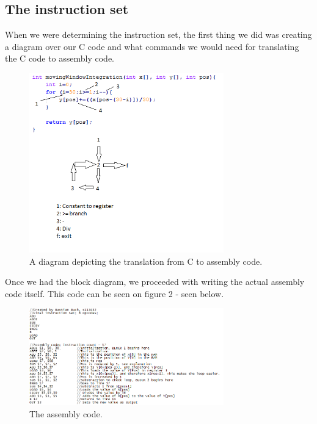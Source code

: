 \documentclass[12pt,a4paper]{article}
\begin{document}
\subsection{The instruction set}
When we were determining the instruction set, the first thing we did was creating a diagram over our C code and what commands we would need for translating the C code to assembly code.
\newpage
\begin{figure}[h!]
  \centering
    \includegraphics[width=0.75\textwidth]{C_to_assembly_diagram.png}
  \caption{A diagram depicting the translation from C to assembly code.}
\end{figure}

Once we had the block diagram, we proceeded with writing the actual assembly code itself. This code can be seen on figure 2 - seen below.

\begin{figure}[h!]
  \centering
    \includegraphics[width=0.75\textwidth]{screenshot_assembly.png}
  \caption{The assembly code.}
\end{figure}
\end{document}
